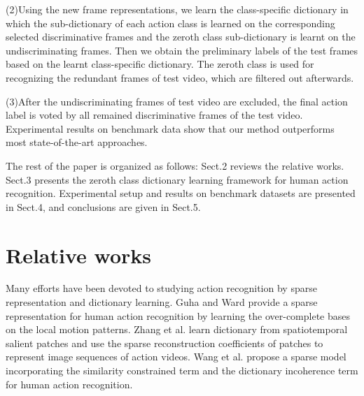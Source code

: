 \documentclass{article}
\begin{document}
(2)Using the new frame representations, we learn the class-specific dictionary in which the sub-dictionary of each action class is learned on the corresponding selected discriminative frames and the zeroth class sub-dictionary is learnt on the undiscriminating frames.
Then we obtain the preliminary labels of the test frames based on the learnt class-specific dictionary.
The zeroth class is used for recognizing the redundant frames of  test video, which are filtered out afterwards.

(3)After the undiscriminating frames of  test video are excluded, the final action label is voted by all remained discriminative frames of the test video.
Experimental results on benchmark data show that our method outperforms most state-of-the-art approaches.

The rest of the paper is organized as follows:
Sect.2 reviews the relative works.
Sect.3 presents the zeroth class dictionary learning framework
for human action recognition.
Experimental setup and results on
benchmark datasets are presented in Sect.4, and conclusions
are given in Sect.5.


\section{Relative works}
Many efforts \cite{Guha,ZhangICIP2015,Wang20123902} have been devoted to  studying  action recognition by sparse representation  and dictionary learning.
Guha and Ward \cite{Guha} provide a sparse representation for human action recognition by learning the over-complete bases on the local motion patterns.
Zhang et al.  \cite{ZhangICIP2015} learn dictionary from spatiotemporal salient patches and use the  sparse reconstruction coefficients  of patches to represent image sequences of action videos.
Wang et al. \cite{Wang20123902} propose a  sparse model incorporating the similarity constrained term and the dictionary incoherence term  for human action recognition.
\end{document}
